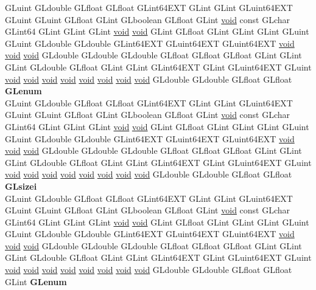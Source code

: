 \begin{DoxyCompactItemize}
\begin{tabbing}
\>GLuint GLdouble GLfloat GLfloat GLint64EXT GLint GLint GLuint64EXT GLuint GLuint GLfloat GLint GLboolean GLfloat GLint \hyperlink{interfacevoid}{void} const GLchar GLint64 GLint GLint GLint \hyperlink{interfacevoid}{void} \hyperlink{interfacevoid}{void} GLint GLfloat GLint GLint GLint GLuint GLuint GLdouble GLdouble GLint64EXT GLuint64EXT GLuint64EXT \hyperlink{interfacevoid}{void} \hyperlink{interfacevoid}{void} \hyperlink{interfacevoid}{void} GLdouble GLdouble GLdouble GLfloat GLfloat GLfloat GLint GLint GLint GLdouble GLfloat GLint GLint GLint64EXT GLint GLuint64EXT GLuint \hyperlink{interfacevoid}{void} \hyperlink{interfacevoid}{void} \hyperlink{interfacevoid}{void} \hyperlink{interfacevoid}{void} \hyperlink{interfacevoid}{void} \hyperlink{interfacevoid}{void} \hyperlink{interfacevoid}{void} \hyperlink{interfacevoid}{void} GLdouble GLdouble GLfloat GLfloat {\bfseries GLenum}\\
\>GLuint GLdouble GLfloat GLfloat GLint64EXT GLint GLint GLuint64EXT GLuint GLuint GLfloat GLint GLboolean GLfloat GLint \hyperlink{interfacevoid}{void} const GLchar GLint64 GLint GLint GLint \hyperlink{interfacevoid}{void} \hyperlink{interfacevoid}{void} GLint GLfloat GLint GLint GLint GLuint GLuint GLdouble GLdouble GLint64EXT GLuint64EXT GLuint64EXT \hyperlink{interfacevoid}{void} \hyperlink{interfacevoid}{void} \hyperlink{interfacevoid}{void} GLdouble GLdouble GLdouble GLfloat GLfloat GLfloat GLint GLint GLint GLdouble GLfloat GLint GLint GLint64EXT GLint GLuint64EXT GLuint \hyperlink{interfacevoid}{void} \hyperlink{interfacevoid}{void} \hyperlink{interfacevoid}{void} \hyperlink{interfacevoid}{void} \hyperlink{interfacevoid}{void} \hyperlink{interfacevoid}{void} \hyperlink{interfacevoid}{void} \hyperlink{interfacevoid}{void} GLdouble GLdouble GLfloat GLfloat {\bfseries GLsizei}\\
\>GLuint GLdouble GLfloat GLfloat GLint64EXT GLint GLint GLuint64EXT GLuint GLuint GLfloat GLint GLboolean GLfloat GLint \hyperlink{interfacevoid}{void} const GLchar GLint64 GLint GLint GLint \hyperlink{interfacevoid}{void} \hyperlink{interfacevoid}{void} GLint GLfloat GLint GLint GLint GLuint GLuint GLdouble GLdouble GLint64EXT GLuint64EXT GLuint64EXT \hyperlink{interfacevoid}{void} \hyperlink{interfacevoid}{void} \hyperlink{interfacevoid}{void} GLdouble GLdouble GLdouble GLfloat GLfloat GLfloat GLint GLint GLint GLdouble GLfloat GLint GLint GLint64EXT GLint GLuint64EXT GLuint \hyperlink{interfacevoid}{void} \hyperlink{interfacevoid}{void} \hyperlink{interfacevoid}{void} \hyperlink{interfacevoid}{void} \hyperlink{interfacevoid}{void} \hyperlink{interfacevoid}{void} \hyperlink{interfacevoid}{void} \hyperlink{interfacevoid}{void} GLdouble GLdouble GLfloat GLfloat GLint {\bfseries GLenum}\\

\end{tabbing}
\end{DoxyCompactItemize}
